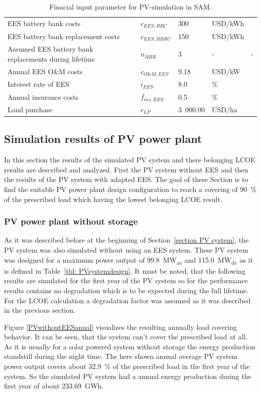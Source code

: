 \begin{table}[!h]
\begin{tabular}{  p{5.4cm} C{1.5cm} C{1.5cm}  C{1.7cm}  C{4.0cm} }
EES battery bank costs & $c_{EES,BBC}$ &300 & USD/kWh & \cite{Nykvist2015} \\ 
EES battery bank replacement costs & $c_{EES,BBRC}$ & 150 & USD/kWh & \cite{Zakeri2015} \\ 
Assumed EES battery bank replacements during lifetime & $n_{BBR}$ & 3 & - & - \\ 
Annual EES O\&M costs & $c_{O\&M,EES}$ & 9.18 & USD/kW & \cite{Zakeri2015}\\
Interest rate of EES & $i_{EES}$& 8.0 & \% & \cite{Zakeri2015} \\
Annual insurance costs& $f_{ins,EES}$ & 0.5 & \% & \cite{Cutter2014}\\ \hline
Land purchase &$c_{LP}$ & 3~000.00 & USD/ha & \cite{Cassell2012} \\ 
\hline
\end{tabular}
\caption[Finacial input parameter for PV-simulation in SAM.]{Finacial input parameter for PV-simulation in SAM.}\label{tbl: PVFinance}
\end{table}
\pagebreak
\subsection{Simulation results of PV power plant}
In this section the results of the simulated PV system and there belonging LCOE results are described and analyzed. First the PV system without EES and then the results of the PV system with adapted EES. The goal of these Section is to find the suitable PV power plant design configuration to reach a covering of 90~\% of the prescribed load which having the lowest belonging LCOE result.
\subsubsection{PV power plant without storage}
As it was described before at the beginning of Section~\ref{section PV system}, the PV system was also simulated without using an EES system. These PV system was designed for a maximum power output of 99.8~MW\textsubscript{ac} and 115.0~MW\textsubscript{dc} as it is defined in Table~\ref{tbl: PVsystemdesign}. It must be noted, that the following results are simulated for the first year of the PV system so for the performance results contains no degradation which is to be expected during the full lifetime. For the LCOE calculation a degradation factor was assumed as it was described in the previous section. 

Figure \ref{PVwithoutEESanual} visualizes the resulting annually load covering behavior. It can be seen, that the system can't cover the prescribed load at all. As it is usually for a solar powered system without storage the energy production standstill during the night time. The here shown annual average PV system power output covers about 32.9~\% of the prescribed load in the first year of the system. So the simulated PV system had a annual energy production during the first year of about 233.69~GWh.

